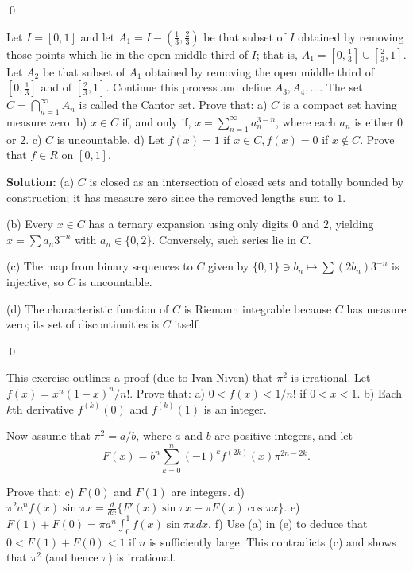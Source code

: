\qed
\begin{problembox}
Let $I = [0, 1]$ and let $A_1 = I - (\frac{1}{3}, \frac{2}{3})$ be that subset of $I$ obtained by removing those points which lie in the open middle third of $I$; that is, $A_1 = [0, \frac{1}{3}] \cup [\frac{2}{3}, 1]$. Let $A_2$ be that subset of $A_1$ obtained by removing the open middle third of $[0, \frac{1}{3}]$ and of $[\frac{2}{3}, 1]$. Continue this process and define $A_3, A_4, \ldots$. The set $C = \bigcap_{n=1}^{\infty} A_n$ is called the Cantor set. Prove that:
a) $C$ is a compact set having measure zero.
b) $x \in C$ if, and only if, $x = \sum_{n=1}^{\infty} a_n^{3-n}$, where each $a_n$ is either 0 or 2.
c) $C$ is uncountable.
d) Let $f(x) = 1$ if $x \in C, f(x) = 0$ if $x \notin C$. Prove that $f \in R$ on $[0, 1]$.
\end{problembox}

\noindent\textbf{Solution:}
(a) $C$ is closed as an intersection of closed sets and totally bounded by construction; it has measure zero since the removed lengths sum to $1$.

(b) Every $x\in C$ has a ternary expansion using only digits $0$ and $2$, yielding $x=\sum a_n 3^{-n}$ with $a_n\in\{0,2\}$. Conversely, such series lie in $C$.

(c) The map from binary sequences to $C$ given by $\{0,1\}\ni b_n\mapsto \sum (2b_n)3^{-n}$ is injective, so $C$ is uncountable.

(d) The characteristic function of $C$ is Riemann integrable because $C$ has measure zero; its set of discontinuities is $C$ itself.




\qed
\begin{problembox}[7.33: Irrationality of $\pi^2$]
This exercise outlines a proof (due to Ivan Niven) that $\pi^2$ is irrational. Let $f(x) = x^n(1 - x)^n/n!$. Prove that:
a) $0 < f(x) < 1/n!$ if $0 < x < 1$.
b) Each $k$th derivative $f^{(k)}(0)$ and $f^{(k)}(1)$ is an integer.

Now assume that $\pi^2 = a/b$, where $a$ and $b$ are positive integers, and let
\[F(x) = b^n \sum_{k=0}^{n} (-1)^k f^{(2k)}(x) \pi^{2n-2k}.\]

Prove that:
c) $F(0)$ and $F(1)$ are integers.
d) $\pi^2 a^n f(x) \sin \pi x = \frac{d}{dx} \{ F'(x) \sin \pi x - \pi F(x) \cos \pi x \}$.
e) $F(1) + F(0) = \pi a^n \int_{0}^{1} f(x) \sin \pi x dx$.
f) Use (a) in (e) to deduce that $0 < F(1) + F(0) < 1$ if $n$ is sufficiently large. This contradicts (c) and shows that $\pi^2$ (and hence $\pi$) is irrational.
\end{problembox}

